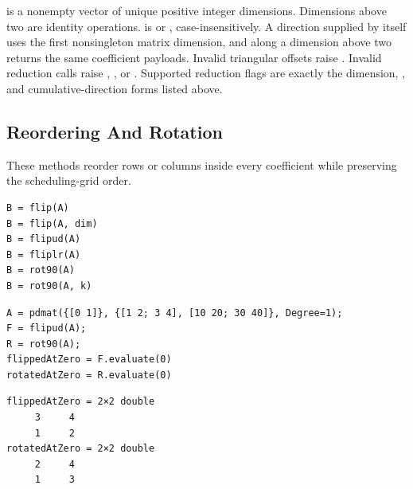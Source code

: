  is a nonempty vector of unique positive integer dimensions. Dimensions above two are identity operations.  is  or , case-insensitively. A direction supplied by itself uses the first nonsingleton matrix dimension, and  along a dimension above two returns the same coefficient payloads. Invalid triangular offsets raise . Invalid reduction calls raise , , or . Supported reduction flags are exactly the dimension, , and cumulative-direction forms listed above.

\subsection{Reordering And Rotation}
\label{sec:pdmat-matrix-reorder}

These methods reorder rows or columns inside every coefficient while preserving the scheduling-grid order.

\syntaxhead
\begin{lstlisting}[style=dpsyntax]
B = flip(A)
B = flip(A, dim)
B = flipud(A)
B = fliplr(A)
B = rot90(A)
B = rot90(A, k)
\end{lstlisting}

\examplehead
\begin{lstlisting}[style=dpmatlab]
A = pdmat({[0 1]}, {[1 2; 3 4], [10 20; 30 40]}, Degree=1);
F = flipud(A);
R = rot90(A);
flippedAtZero = F.evaluate(0)
rotatedAtZero = R.evaluate(0)
\end{lstlisting}

\begin{lstlisting}[style=dpoutput]
flippedAtZero = 2×2 double
     3     4
     1     2
rotatedAtZero = 2×2 double
     2     4
     1     3
\end{lstlisting}

\begin{center}
\end{center}

